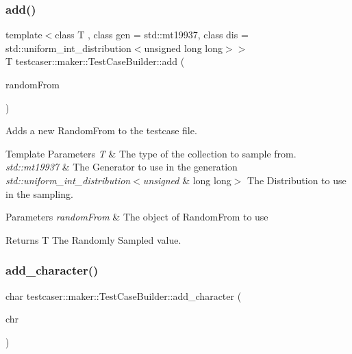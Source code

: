 \subsubsection{\texorpdfstring{add()}{add()}\hspace{0.1cm}{\footnotesize\ttfamily [11/11]}}
{\footnotesize\ttfamily template$<$class T , class gen  = std\+::mt19937, class dis  = std\+::uniform\+\_\+int\+\_\+distribution$<$unsigned long long$>$$>$ \\
T testcaser\+::maker\+::\+Test\+Case\+Builder\+::add (\begin{DoxyParamCaption}\item[{\mbox{\hyperlink{structtestcaser_1_1maker_1_1types_1_1RandomFrom}{types\+::\+Random\+From}}$<$ T, gen, dis $>$ \&}]{random\+From }\end{DoxyParamCaption})\hspace{0.3cm}{\ttfamily [inline]}}



Adds a new Random\+From to the testcase file. 


\begin{DoxyTemplParams}{Template Parameters}
{\em T} & The type of the collection to sample from. \\
\hline
{\em std\+::mt19937} & The Generator to use in the generation \\
\hline
{\em std\+::uniform\+\_\+int\+\_\+distribution$<$unsigned} & long long$>$ The Distribution to use in the sampling. \\
\hline
\end{DoxyTemplParams}

\begin{DoxyParams}{Parameters}
{\em random\+From} & The object of Random\+From to use \\
\hline
\end{DoxyParams}
\begin{DoxyReturn}{Returns}
T The Randomly Sampled value. 
\end{DoxyReturn}
\mbox{\label{classtestcaser_1_1maker_1_1TestCaseBuilder_a41885a504a99f9c450e793e183898488}} 
\subsubsection{\texorpdfstring{add\_character()}{add\_character()}}
{\footnotesize\ttfamily char testcaser\+::maker\+::\+Test\+Case\+Builder\+::add\+\_\+character (\begin{DoxyParamCaption}\item[{char}]{chr }\end{DoxyParamCaption})\hspace{0.3cm}{\ttfamily [inline]}}



